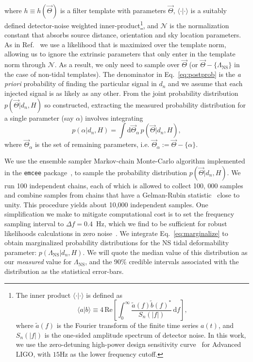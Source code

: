 \documentclass[aps,prd,amsmath,floats,floatfix, twocolumn,
superscriptaddress,nofootinbib,showpacs]{revtex4-1}
\newcommand{\D}{\mathrm{d}}
\newcommand{\lambdans}{\Lambda_\mathrm{NS}}
\begin{document}
where $h\equiv h(\vec{\Theta})$ is a filter template with parameters 
$\vec{\Theta}$, $\langle\cdot|\cdot\rangle$ is a suitably defined
detector-noise weighted inner-product\footnote{The inner product
$\langle\cdot|\cdot\rangle$  is defined as
\begin{equation}
\langle a|b\rangle \equiv 4\,\mathrm{Re}\left[\int_0^\infty \dfrac{\tilde{a}(f) \tilde{b}(f)^*}{S_n(|f|)}\,\D f\right],
\end{equation}
where $\tilde{a}(f)$ is the Fourier transform of the finite time series $a(t)$,
and $S_n(|f|)$ is the one-sided amplitude spectrum of detector noise. In this
work, we use the zero-detuning high-power design sensitivity curve~\cite{
Shoemaker2009} for Advanced LIGO, with $15$Hz as the lower frequency cutoff.},
and $\mathcal{N}$ is the normalization constant that absorbs source distance,
orientation and sky location parameters. As in Ref.~\cite{Purrer:2015nkh} we
use a likelihood that is maximized over the template
norm, allowing us to ignore the extrinsic parameters that only enter in the
template norm through $\mathcal{N}$. As a result, we only need to sample over
$\vec{\Theta}$ (or $\vec{\Theta} - \{\lambdans\}$ in the case of non-tidal
templates).
The denominator in Eq.~\ref{eq:postprob} is the {\it a priori} probability of finding
the particular signal in $d_n$ and we assume that each injected signal is as
likely as any other. From the joint probability distribution
$p(\vec{\Theta} | d_n, H)$ so constructed, extracting the measured probability distribution
for a single parameter (say $\alpha$) involves integrating
\begin{equation}\label{eq:marginalize}
 p(\alpha | d_n, H) = \int\D \vec{\Theta}_\alpha\, p(\vec{\Theta} | d_n, H),
\end{equation}
where $\vec{\Theta}_\alpha$ is the set of remaining parameters, i.e.
$\vec{\Theta}_\alpha:=\vec{\Theta} - \{\alpha\}$.

We use the ensemble sampler Markov-chain Monte-Carlo algorithm implemented in
the {\tt emcee} package~\cite{emcee}, to sample the probability distribution 
$p(\vec{\Theta} | d_n, H)$. We run 100 independent chains, each of which is
allowed to collect 100, 000 samples and combine samples from chains that have
a Gelman-Rubin statistic~\cite{gelman1992} close to unity. This procedure yields
about 10,000 independent samples.
% 
% 
One simplification we make to mitigate computational cost is to set the
frequency sampling interval to $\Delta f=0.4$~Hz, which we find to be
sufficient for robust likelihoods calculations in zero noise~\cite{Purrer:2015nkh}.
We integrate
Eq.~\ref{eq:marginalize} to obtain marginalized probability distributions
for the NS tidal deformability parameter: $p(\lambdans|d_n,H)$. We will quote
the median value of this distribution as our {\it measured} value for
$\lambdans$, and the $90\%$ credible intervals associated with the distribution
as the statistical error-bars.
% 
\end{document}
